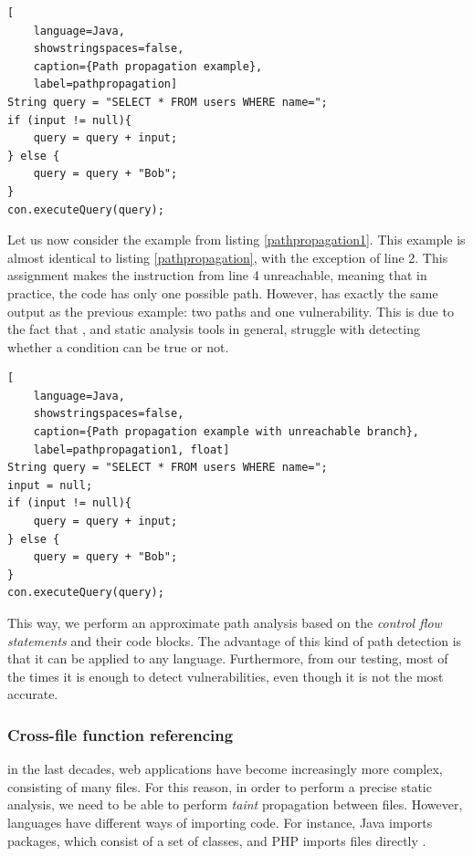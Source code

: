 \begin{lstlisting}[
    language=Java,
    showstringspaces=false,
    caption={Path propagation example},
    label=pathpropagation] 
String query = "SELECT * FROM users WHERE name=";
if (input != null){
    query = query + input;
} else {
    query = query + "Bob";
}
con.executeQuery(query);
\end{lstlisting}

Let us now consider the example from listing \ref{pathpropagation1}. This example is almost identical to listing \ref{pathpropagation}, with the exception of line 2. This assignment makes the instruction from line 4 unreachable, meaning that in practice, the code has only one possible path. However, \toolname{} has exactly the same output as the previous example: two paths and one vulnerability. This is due to the fact that \toolname{}, and static analysis tools in general, struggle with detecting whether a condition can be true or not.

\begin{lstlisting}[
    language=Java,
    showstringspaces=false,
    caption={Path propagation example with unreachable branch},
    label=pathpropagation1, float] 
String query = "SELECT * FROM users WHERE name=";
input = null;
if (input != null){
    query = query + input;
} else {
    query = query + "Bob";
}
con.executeQuery(query);
\end{lstlisting}

This way, we perform an approximate path analysis based on the \textit{control flow statements} and their code blocks. The advantage of this kind of path detection is that it can be applied to any language. Furthermore, from our testing, most of the times it is enough to detect vulnerabilities, even though it is not the most accurate.


\subsubsection{Cross-file function referencing} in the last decades, web applications have become increasingly more complex, consisting of many files. For this reason, in order to perform a precise static analysis, we need to be able to perform \textit{taint} propagation between files. However, languages have different ways of importing code. For instance, Java imports packages, which consist of a set of classes, and PHP imports files directly \cite{rountev2004static,hills2014static}. 

